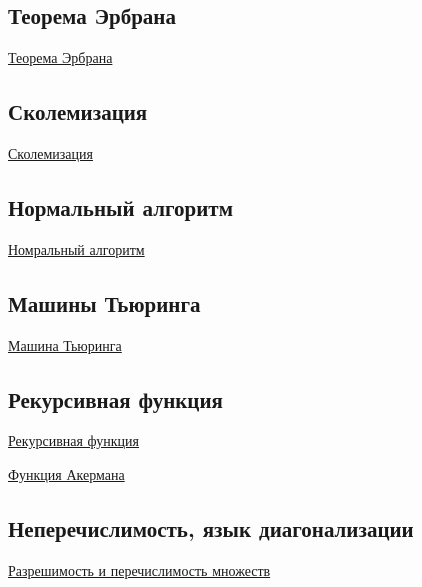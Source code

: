 \documentclass{article}
\begin{document}
\subsection{Теорема Эрбрана}

\href{https://intuit.ru/studies/professional_skill_improvements/2162/courses/133/lecture/3745?page=2}{Теорема Эрбрана}

\subsection{Сколемизация}

\href{https://helpiks.org/6-22101.html}{Сколемизация}

\subsection{Нормальный алгоритм}

\href{https://ru.wikipedia.org/wiki/%D0%9D%D0%BE%D1%80%D0%BC%D0%B0%D0%BB%D1%8C%D0%BD%D1%8B%D0%B9_%D0%B0%D0%BB%D0%B3%D0%BE%D1%80%D0%B8%D1%82%D0%BC}{Номральный алгоритм}

\subsection{Машины Тьюринга}

\href{https://neerc.ifmo.ru/wiki/index.php?title=%D0%9C%D0%B0%D1%88%D0%B8%D0%BD%D0%B0_%D0%A2%D1%8C%D1%8E%D1%80%D0%B8%D0%BD%D0%B3%D0%B0}{Машина Тьюринга}


\subsection{Рекурсивная функция}

\href{https://ru.wikipedia.org/wiki/%D0%A0%D0%B5%D0%BA%D1%83%D1%80%D1%81%D0%B8%D0%B2%D0%BD%D0%B0%D1%8F_%D1%84%D1%83%D0%BD%D0%BA%D1%86%D0%B8%D1%8F_(%D1%82%D0%B5%D0%BE%D1%80%D0%B8%D1%8F_%D0%B2%D1%8B%D1%87%D0%B8%D1%81%D0%BB%D0%B8%D0%BC%D0%BE%D1%81%D1%82%D0%B8)}{Рекурсивная функция}

\href{https://ru.wikipedia.org/wiki/%D0%A4%D1%83%D0%BD%D0%BA%D1%86%D0%B8%D1%8F_%D0%90%D0%BA%D0%BA%D0%B5%D1%80%D0%BC%D0%B0%D0%BD%D0%B0}{Функция Акермана}

\subsection{Неперечислимость, язык диагонализации}

\href{http://mathhelpplanet.com/static.php?p=razreshimost-i-perechislimost-mnozhestv}{Разрешимость и перечислимость множеств}
\end{document}

